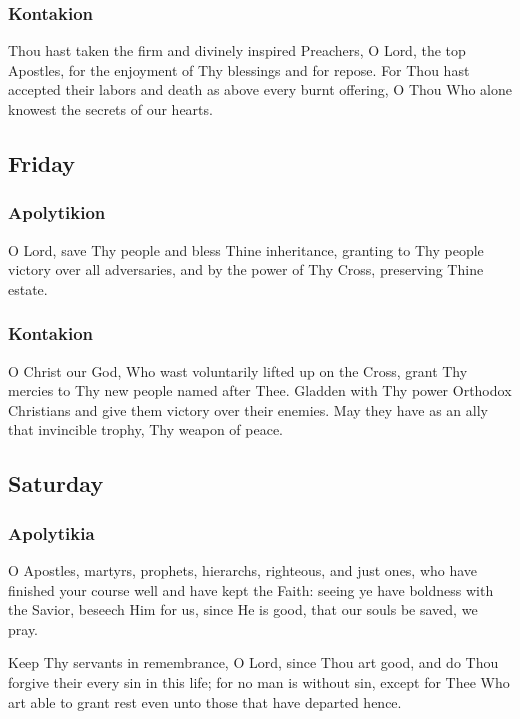 \subsubsection{Kontakion}

Thou hast taken the firm and divinely inspired Preachers, O Lord, the top Apostles, for the enjoyment of Thy blessings and for repose. For Thou hast accepted their labors and death as above every burnt offering, O Thou Who alone knowest the secrets of our hearts.

\subsection{Friday}

\subsubsection{Apolytikion}

 O Lord, save Thy people and bless Thine inheritance, granting to Thy people victory over all adversaries, and by the power of Thy Cross, preserving Thine estate.

\subsubsection{Kontakion}

 O Christ our God, Who wast voluntarily lifted up on the Cross, grant Thy mercies to Thy new people named after Thee. Gladden with Thy power Orthodox Christians and give them victory over their enemies. May they have as an ally that invincible trophy, Thy weapon of peace.

\subsection{Saturday}

\subsubsection{Apolytikia}

 O Apostles, martyrs, prophets, hierarchs, righteous, and just ones, who have finished your course well and have kept the Faith: seeing ye have boldness with the Savior, beseech Him for us, since He is good, that our souls be saved, we pray.

 Keep Thy servants in remembrance, O Lord, since Thou art good, and do Thou forgive their every sin in this life; for no man is without sin, except for Thee Who art able to grant rest even unto those that have departed hence.

